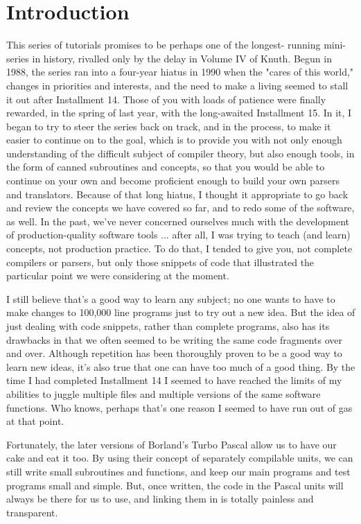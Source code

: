 \documentclass[float=false, crop=false]{standalone}
\begin{document}
\section{Introduction}

This series of tutorials promises to be perhaps one of the longest- running
mini-series in history, rivalled only by the delay in Volume IV of Knuth. Begun
in 1988, the series ran into a four-year hiatus in 1990 when the "cares of this
world," changes in priorities and interests, and the need to make a living
seemed to stall it out after Installment 14. Those of you with loads of patience
were finally rewarded, in the spring of last year, with the long-awaited
Installment 15. In it, I began to try to steer the series back on track, and in
the process, to make it easier to continue on to the goal, which is to provide
you with not only enough understanding of the difficult subject of compiler
theory, but also enough tools, in the form of canned subroutines and concepts,
so that you would be able to continue on your own and become proficient enough
to build your own parsers and translators. Because of that long hiatus, I
thought it appropriate to go back and review the concepts we have covered so
far, and to redo some of the software, as well. In the past, we've never
concerned ourselves much with the development of production-quality software
tools ... after all, I was trying to teach (and learn) concepts, not production
practice. To do that, I tended to give you, not complete compilers or parsers,
but only those snippets of code that illustrated the particular point we were
considering at the moment.

I still believe that's a good way to learn any subject; no one wants to have to
make changes to 100,000 line programs just to try out a new idea. But the idea
of just dealing with code snippets, rather than complete programs, also has its
drawbacks in that we often seemed to be writing the same code fragments over and
over. Although repetition has been thoroughly proven to be a good way to learn
new ideas, it's also true that one can have too much of a good thing. By the
time I had completed Installment 14 I seemed to have reached the limits of my
abilities to juggle multiple files and multiple versions of the same software
functions. Who knows, perhaps that's one reason I seemed to have run out of gas
at that point.

Fortunately, the later versions of Borland's Turbo Pascal allow us to have our
cake and eat it too. By using their concept of separately compilable units, we
can still write small subroutines and functions, and keep our main programs and
test programs small and simple. But, once written, the code in the Pascal units
will always be there for us to use, and linking them in is totally painless and
transparent.
\end{document}
